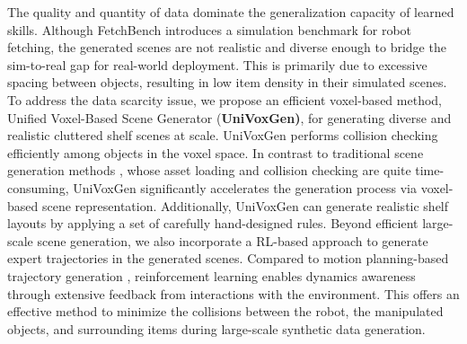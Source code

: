 The quality and quantity of data dominate the generalization capacity of learned skills.
Although FetchBench \cite{han2024fetchbench} introduces a simulation benchmark for robot fetching, the generated scenes are not realistic and diverse enough to bridge the sim-to-real gap for real-world deployment. This is primarily due to excessive spacing between objects, resulting in low item density in their simulated scenes.
To address the data scarcity issue, we propose an efficient voxel-based method, Unified Voxel-Based Scene Generator (\textbf{UniVoxGen)}, for generating diverse and realistic cluttered shelf scenes at scale. UniVoxGen performs collision checking efficiently among objects in the voxel space. In contrast to traditional scene generation methods \cite{jia2024cluttergen,zhou2024scenex,dalal2024neural,han2024fetchbench,murali2023cabinet,chamzas2021motionbenchmaker}, whose asset loading and collision checking are quite time-consuming, UniVoxGen significantly accelerates the generation process via voxel-based scene representation. Additionally, UniVoxGen can generate realistic shelf layouts by applying a set of carefully hand-designed rules.
Beyond efficient large-scale scene generation, we also incorporate a RL-based approach to generate expert trajectories in the generated scenes. Compared to motion planning-based trajectory generation \cite{dalal2024neural}, reinforcement learning enables dynamics awareness through extensive feedback from interactions with the environment. This offers an effective method to minimize the collisions between the robot, the manipulated objects, and surrounding items during large-scale synthetic data generation.

